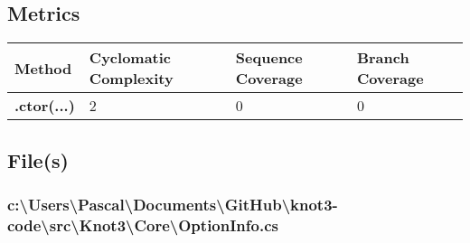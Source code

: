 \documentclass[a4paper,10pt]{article}
\begin{document}
\subsection{Metrics}
\begin{longtable}[l]{|l|l|l|l|}
\hline
\textbf{Method} & \textbf{Cyclomatic Complexity} & \textbf{Sequence Coverage} & \textbf{Branch Coverage}\\
\hline
\textbf{.ctor(...)} & 2 & 0 & 0\\
\hline
\end{longtable}
\subsection{File(s)}
\subsubsection{c:\textbackslash Users\textbackslash Pascal\textbackslash Documents\textbackslash GitHub\textbackslash knot3-code\textbackslash src\textbackslash Knot3\textbackslash Core\textbackslash OptionInfo.cs}
\end{document}
